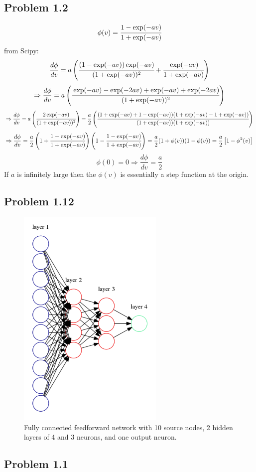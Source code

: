 \documentclass[paper=a4, fontsize=11pt]{scrartcl} %
\begin{document}
    \subsection*{Problem 1.2}
    \[ \phi(v) = \cfrac{1 - \exp(-av)}{1 + \exp(-av)} \]
    from Scipy:
    \[ \frac{d\phi}{dv} = a \left(
                            \cfrac{(1 - \exp(-av))\exp(-av)}{(1 + \exp(-av))^2} +
                            \cfrac{\exp(-av)}{1 + \exp(-av)}
                            \right) \]
    \[ \Rightarrow \frac{d\phi}{dv} = a \left(
                            \cfrac{\exp(-av) - \exp(-2av) + \exp(-av) + \exp(-2av)}{(1 + \exp(-av))^2}
                            \right) \]
    \[ \Rightarrow \frac{d\phi}{dv} =
                        a \left(\cfrac{2\exp(-av)}{(1 + \exp(-av))^2}\right) =
                        \frac{a}{2} \left(
                        \cfrac{(1 + \exp(-av) + 1 - \exp(-av))(1 + \exp(-av) - 1 + \exp(-av))}{(1 + \exp(-av))(1 + \exp(-av))}
                        \right) 
                        \]
    \[ \Rightarrow \frac{d\phi}{dv} = \frac{a}{2}
                        \left(1 + \cfrac{1 - \exp(-av)}{1 + \exp(-av)} \right)
                        \left(1 - \cfrac{1 - \exp(-av)}{1 + \exp(-av)} \right) =
                        \frac{a}{2} (1 + \phi(v))(1 - \phi(v)) =
                        \frac{a}{2} \left[ 1 - \phi^2(v) \right]
                        \]
    \[ \phi(0) = 0 \Rightarrow \frac{d\phi}{dv} = \frac{a}{2} \]
    If $a$ is infinitely large then the $\phi(v)$ is essentially a step function at the origin.

    \newpage
    \subsection*{Problem 1.12}
    \begin{figure}[h!]
        \begin{center}
        \setlength{\fboxsep}{0.5pt} %
        \setlength{\fboxrule}{0.5pt}
        \includegraphics[width=7.0cm,fbox]{NN_MinhNguyen_20160928_ex1-12.png}
        \caption{Fully connected feedforward network with 10 source nodes, 2 hidden layers of 4 and 3 neurons, and one output neuron.}
        \end{center}
    \end{figure}

    \subsection*{Problem 1.1}
\end{document}
